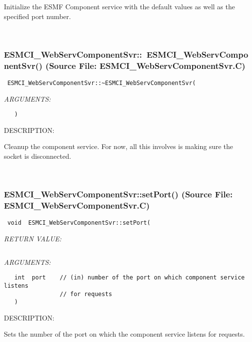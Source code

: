       Initialize the ESMF Component service with the default values as well
      as the specified port number.
   
 
\mbox{}\hrulefill\
 
\subsubsection{ESMCI\_WebServComponentSvr::~ESMCI\_WebServComponentSvr() (Source File: ESMCI\_WebServComponentSvr.C)}


  
\begin{verbatim} ESMCI_WebServComponentSvr::~ESMCI_WebServComponentSvr(\end{verbatim}{\em ARGUMENTS:}
\begin{verbatim}   )\end{verbatim}
{\sf DESCRIPTION:\\ }


      Cleanup the component service.  For now, all this involves is making
      sure the socket is disconnected.
   
 
\mbox{}\hrulefill\
 
\subsubsection{ESMCI\_WebServComponentSvr::setPort() (Source File: ESMCI\_WebServComponentSvr.C)}


  
\begin{verbatim} void  ESMCI_WebServComponentSvr::setPort(\end{verbatim}{\em RETURN VALUE:}
\begin{verbatim} \end{verbatim}{\em ARGUMENTS:}
\begin{verbatim}   int  port    // (in) number of the port on which component service listens
                // for requests
   )\end{verbatim}
{\sf DESCRIPTION:\\ }


      Sets the number of the port on which the component service listens
      for requests.
   
 
